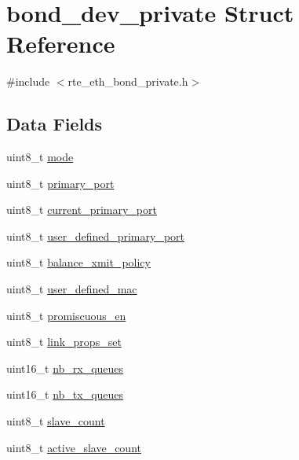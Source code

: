 \hypertarget{structbond__dev__private}{}\section{bond\+\_\+dev\+\_\+private Struct Reference}
\label{structbond__dev__private}


{\ttfamily \#include $<$rte\+\_\+eth\+\_\+bond\+\_\+private.\+h$>$}

\subsection*{Data Fields}
\begin{DoxyCompactItemize}
\item 
uint8\+\_\+t \hyperlink{structbond__dev__private_a37e90f5e3bd99fac2021fb3a326607d4}{mode}
\item 
uint8\+\_\+t \hyperlink{structbond__dev__private_ae340e5cdcbe69229f5806f0cabcb07d0}{primary\+\_\+port}
\item 
uint8\+\_\+t \hyperlink{structbond__dev__private_ad3dfc83b886db5b43a715eb7e50bd32e}{current\+\_\+primary\+\_\+port}
\item 
uint8\+\_\+t \hyperlink{structbond__dev__private_a70188fdb8ba685a9505871dd8622d7fe}{user\+\_\+defined\+\_\+primary\+\_\+port}
\item 
uint8\+\_\+t \hyperlink{structbond__dev__private_a39595da5d563085994b8584c3220571b}{balance\+\_\+xmit\+\_\+policy}
\item 
uint8\+\_\+t \hyperlink{structbond__dev__private_a1eb4891c38992140bd42386262d54e1b}{user\+\_\+defined\+\_\+mac}
\item 
uint8\+\_\+t \hyperlink{structbond__dev__private_a1116c885f822943f992ed455f278671e}{promiscuous\+\_\+en}
\item 
uint8\+\_\+t \hyperlink{structbond__dev__private_a8d6d530ad1e5e5d4a8f725e6fa44e751}{link\+\_\+props\+\_\+set}
\item 
uint16\+\_\+t \hyperlink{structbond__dev__private_ae6fa0630eafe59d603f1ed9123dcc7fe}{nb\+\_\+rx\+\_\+queues}
\item 
uint16\+\_\+t \hyperlink{structbond__dev__private_a3dc35933233d56e550e5914aad387408}{nb\+\_\+tx\+\_\+queues}
\item 
uint8\+\_\+t \hyperlink{structbond__dev__private_ae245bc94feb81da053cc77f63abc07e2}{slave\+\_\+count}
\item 
uint8\+\_\+t \hyperlink{structbond__dev__private_a4a2bb0c7965b8ede372d218d270465e0}{active\+\_\+slave\+\_\+count}

\end{DoxyCompactItemize}
